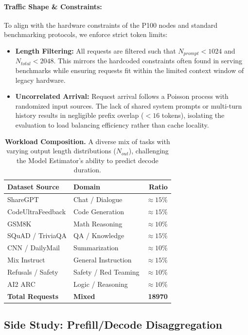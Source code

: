 \documentclass[letterpaper, anonymous, twocolumn, 10pt]{article}
\begin{document}
\paragraph{Traffic Shape \& Constraints:}
To align with the hardware constraints of the P100 nodes and standard benchmarking protocols, we enforce strict token limits:
\begin{itemize}
    \item \textbf{Length Filtering:} All requests are filtered such that $N_{prompt} < 1024$ and $N_{total} < 2048$. This mirrors the hardcoded constraints often found in serving benchmarks while ensuring requests fit within the limited context window of legacy hardware.
    \item \textbf{Uncorrelated Arrival:} Request arrival follows a Poisson process with randomized input sources. The lack of shared system prompts or multi-turn history results in negligible prefix overlap ($<16$ tokens), isolating the evaluation to load balancing efficiency rather than cache locality.
\end{itemize}

\begin{table}[h]
\centering
\small
\begin{tabular}{l|l|r}
\hline
\textbf{Dataset Source} & \textbf{Domain} & \textbf{Ratio} \\
\hline
ShareGPT & Chat / Dialogue & $\approx 15\%$ \\
CodeUltraFeedback & Code Generation & $\approx 15\%$ \\
GSM8K & Math Reasoning & $\approx 10\%$ \\
SQuAD / TriviaQA & QA / Knowledge & $\approx 15\%$ \\
CNN / DailyMail & Summarization & $\approx 10\%$ \\
Mix Instruct & General Instruction & $\approx 15\%$ \\
Refusals / Safety & Safety / Red Teaming & $\approx 10\%$ \\
AI2 ARC & Logic / Reasoning & $\approx 10\%$ \\
\hline
\textbf{Total Requests} & \textbf{Mixed} & \textbf{18970} \\
\hline
\end{tabular}
\caption{\textbf{Workload Composition.} A diverse mix of tasks with varying output length distributions ($N_{out}$), challenging the Model Estimator's ability to predict decode duration.}
\label{tab:dataset}
\end{table}

\subsection{Side Study: Prefill/Decode Disaggregation} \label{sec:eval_pd}
\end{document}
